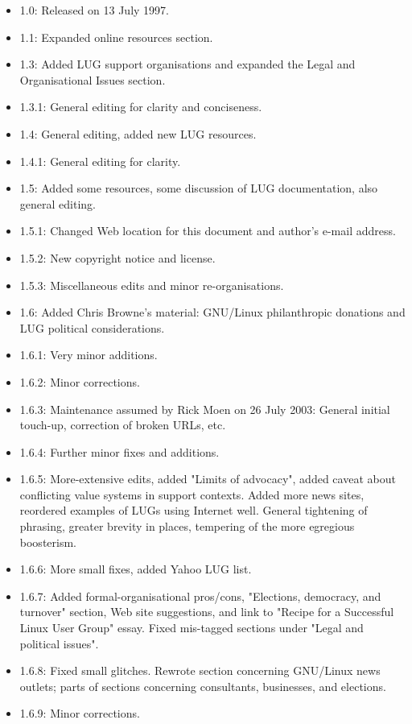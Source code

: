 \begin{itemize}
\item 1.0: Released on 13 July 1997.
\item 1.1: Expanded online resources section.
\item 1.3: Added LUG support organisations and expanded the Legal and Organisational Issues section.
\item 1.3.1: General editing for clarity and conciseness.
\item 1.4: General editing, added new LUG resources.
\item 1.4.1: General editing for clarity.
\item 1.5: Added some resources, some discussion of LUG documentation, also general editing.
\item 1.5.1: Changed Web location for this document and author's e-mail address.
\item 1.5.2: New copyright notice and license.
\item 1.5.3: Miscellaneous edits and minor re-organisations.
\item 1.6: Added Chris Browne's material: GNU/Linux philanthropic
donations and LUG political considerations.
\item 1.6.1: Very minor additions.
\item 1.6.2: Minor corrections.
\item 1.6.3: Maintenance assumed by Rick Moen on 26 July 2003:  General 
initial touch-up, correction of broken URLs, etc.
\item 1.6.4: Further minor fixes and additions.
\item 1.6.5: More-extensive edits, added "Limits of advocacy",
added caveat about conflicting value systems in support contexts.  Added
more news sites, reordered examples of LUGs using Internet well.  General 
tightening of phrasing, greater brevity in places, tempering of the more
egregious boosterism.
\item 1.6.6: More small fixes, added Yahoo LUG list.
\item 1.6.7: Added formal-organisational pros/cons, "Elections,
democracy, and turnover" section, Web site suggestions, and link
to "Recipe for a Successful Linux User Group" essay. Fixed mis-tagged 
sections under "Legal and political issues".
\item 1.6.8: Fixed small glitches.  Rewrote section concerning
GNU/Linux news outlets; parts of sections concerning consultants, businesses,
and elections.
\item 1.6.9: Minor corrections.

\end{itemize}
